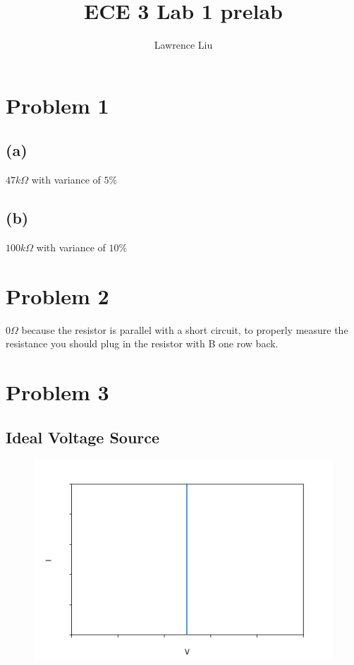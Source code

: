 \documentclass[12pt]{article}
\title{ECE 3 Lab 1 prelab}
\author{Lawrence Liu}
\begin{document}
\maketitle
\section*{Problem 1}
\subsection*{(a)}
$47k\Omega$ with variance of $5\%$
\subsection*{(b)}
$100k\Omega$ with variance of $10\%$
\section*{Problem 2}
$0\Omega$ because the resistor is parallel with a short circuit, to properly measure the resistance you should plug in the resistor with B one row back.
\section*{Problem 3}
\subsection*{Ideal Voltage Source}
\begin{figure}[h]
\includegraphics[scale=0.5]{fig1}
\centering
\end{figure}
\FloatBarrier
\end{document}
